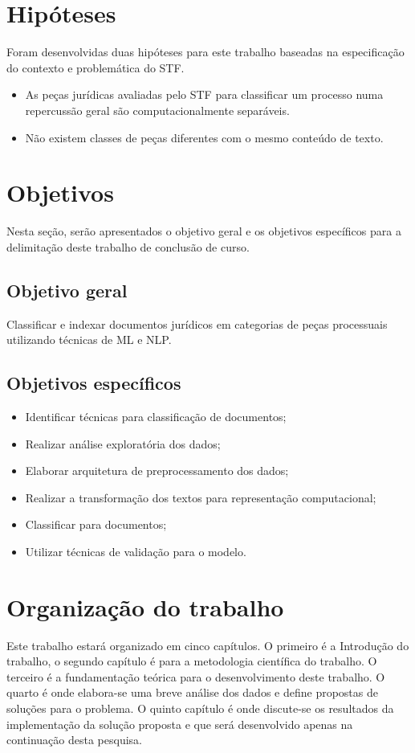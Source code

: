 \section{Hipóteses}

Foram desenvolvidas duas hipóteses \cite{GIL2002} para este trabalho baseadas na especificação do contexto e problemática do STF. 

\begin{itemize}
	\item As peças jurídicas avaliadas pelo STF para classificar um processo numa repercussão geral são computacionalmente separáveis.
    \item Não existem classes de peças diferentes com o mesmo conteúdo de texto.
\end{itemize}

\section{Objetivos}
Nesta seção, serão apresentados o objetivo geral e os objetivos específicos para a delimitação deste trabalho de conclusão de curso.

\subsection{Objetivo geral}

Classificar e indexar documentos jurídicos em categorias de peças processuais utilizando técnicas de ML e NLP.

\subsection{Objetivos específicos}    

\begin{itemize}
  \item Identificar técnicas para classificação de documentos;
  \item Realizar análise exploratória dos dados;
  \item Elaborar arquitetura de preprocessamento dos dados;
  \item Realizar a transformação dos textos para representação computacional;
  \item Classificar para documentos;
  \item Utilizar técnicas de validação para o modelo.
\end{itemize}

\section{Organização do trabalho}
	Este trabalho estará organizado em cinco capítulos. O primeiro é a Introdução do trabalho, o segundo capítulo é para a metodologia científica do trabalho. O terceiro é a fundamentação teórica para o desenvolvimento deste trabalho. O quarto é onde elabora-se uma breve análise dos dados e define propostas de soluções para o problema. O quinto capítulo é onde discute-se os resultados da implementação da solução proposta e que será desenvolvido apenas na continuação desta pesquisa.
